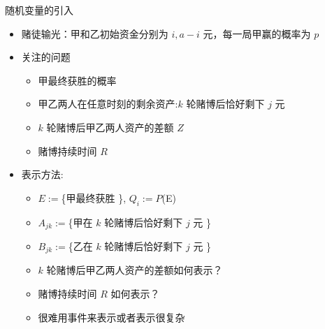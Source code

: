 \documentclass[Prob-All.tex]{subfiles}
\begin{document}
\begin{frame}{随机变量的引入}
	\begin{itemize}[<+-|alert@+>]
		\item 赌徒输光：甲和乙初始资金分别为 $i, a-i$ 元，每一局甲赢的概率为 $p$%
		\item 关注的问题
		      \begin{itemize}[<+-|alert@+>]
			      \item 甲最终获胜的概率
			      \item 甲乙两人在任意时刻的剩余资产:$k$ 轮赌博后恰好剩下 $j$ 元
			      \item $k$ 轮赌博后甲乙两人资产的差额 $Z$
			      \item 赌博持续时间 $R$
		      \end{itemize}
		\item 表示方法:
		      \begin{itemize}[<+-|alert@+>]
			      \item $E:=$\{甲最终获胜 \}, $Q_i:=P$(E)
			      \item $A_{jk}:=$\{甲在 $k$ 轮赌博后恰好剩下 $j$ 元 \}
			      \item $B_{jk}:=$\{乙在 $k$ 轮赌博后恰好剩下 $j$ 元 \}
			      \item $k$ 轮赌博后甲乙两人资产的差额如何表示？
			      \item 赌博持续时间 $R$ 如何表示？
			      \item 很难用事件来表示或者表示很复杂
		      \end{itemize}

	\end{itemize}

\end{frame}
\end{document}

